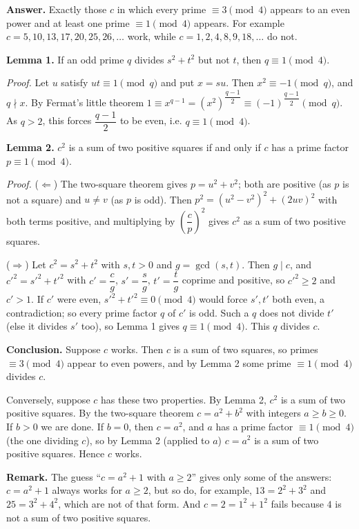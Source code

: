 \textbf{Answer.} Exactly those $c$ in which every prime $\equiv3\pmod4$ appears to an even power and at least one prime $\equiv1\pmod4$ appears. For example $c=5,10,13,17,20,25,26,\ldots$ work, while $c=1,2,4,8,9,18,\ldots$ do not.

\textbf{Lemma 1.} If an odd prime $q$ divides $s^2+t^2$ but not $t$, then $q\equiv1\pmod4$.

\emph{Proof.} Let $u$ satisfy $ut\equiv1\pmod q$ and put $x=su$. Then $x^2\equiv-1\pmod q$, and $q\nmid x$. By Fermat's little theorem $1\equiv x^{q-1}=\left(x^2\right)^{\dfrac{q-1}{2}}\equiv(-1)^{\dfrac{q-1}{2}}\pmod q$. As $q>2$, this forces $\dfrac{q-1}{2}$ to be even, i.e. $q\equiv1\pmod4$.

\textbf{Lemma 2.} $c^2$ is a sum of two positive squares if and only if $c$ has a prime factor $p\equiv1\pmod4$.

\emph{Proof.} ($\Leftarrow$) The two-square theorem gives $p=u^2+v^2$; both are positive (as $p$ is not a square) and $u\ne v$ (as $p$ is odd). Then $p^2=\left(u^2-v^2\right)^2+(2uv)^2$ with both terms positive, and multiplying by $\left(\dfrac {c}{p}\right)^2$ gives $c^2$ as a sum of two positive squares.

($\Rightarrow$) Let $c^2=s^2+t^2$ with $s,t>0$ and $g=\gcd(s,t)$. Then $g\mid c$, and $c'^2=s'^2+t'^2$ with $c'=\dfrac {c}{g}$, $s'=\dfrac {s}{g}$, $t'=\dfrac {t}{g}$ coprime and positive, so $c'^2\ge2$ and $c'>1$. If $c'$ were even, $s'^2+t'^2\equiv0\pmod4$ would force $s',t'$ both even, a contradiction; so every prime factor $q$ of $c'$ is odd. Such a $q$ does not divide $t'$ (else it divides $s'$ too), so Lemma 1 gives $q\equiv1\pmod4$. This $q$ divides $c$.

\textbf{Conclusion.} Suppose $c$ works. Then $c$ is a sum of two squares, so primes $\equiv3\pmod4$ appear to even powers, and by Lemma 2 some prime $\equiv1\pmod4$ divides $c$.

Conversely, suppose $c$ has these two properties. By Lemma 2, $c^2$ is a sum of two positive squares. By the two-square theorem $c=a^2+b^2$ with integers $a\ge b\ge0$. If $b>0$ we are done. If $b=0$, then $c=a^2$, and $a$ has a prime factor $\equiv1\pmod4$ (the one dividing $c$), so by Lemma 2 (applied to $a$) $c=a^2$ is a sum of two positive squares. Hence $c$ works.

\textbf{Remark.} The guess ``$c=a^2+1$ with $a\ge2$'' gives only some of the answers: $c=a^2+1$ always works for $a\ge2$, but so do, for example, $13=2^2+3^2$ and $25=3^2+4^2$, which are not of that form. And $c=2=1^2+1^2$ fails because $4$ is not a sum of two positive squares.
